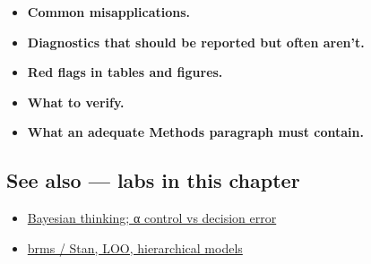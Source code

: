 \documentclass[
]{article}
\providecommand{\tightlist}{%
  \setlength{\itemsep}{0pt}\setlength{\parskip}{0pt}}
\begin{document}
\begin{itemize}
\tightlist
\item
  \textbf{Common misapplications.}
\item
  \textbf{Diagnostics that should be reported but often aren't.}
\item
  \textbf{Red flags in tables and figures.}
\item
  \textbf{What to verify.}
\item
  \textbf{What an adequate Methods paragraph must contain.}
\end{itemize}

\subsection{See also --- labs in this
chapter}\label{see-also-labs-in-this-chapter}

\begin{itemize}
\tightlist
\item
  \href{labs/lab-bayesian-thinking-control-vs-decision-error.Rmd}{Bayesian
  thinking; α control vs decision error}
\item
  \href{labs/lab-brms-stan-loo-hierarchical-models.Rmd}{brms / Stan,
  LOO, hierarchical models}
\end{itemize}
\end{document}
